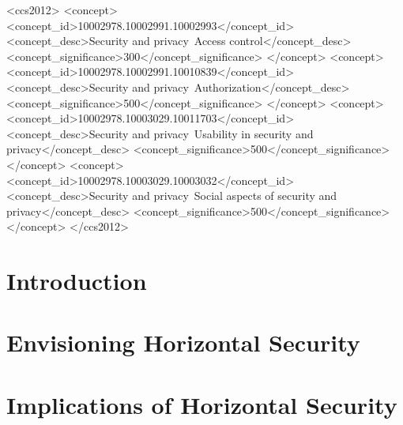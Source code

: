 \documentclass[sigconf, authordraft]{acmart}
\theoremstyle{mydef}
\begin{document}
\begin{CCSXML}
<ccs2012>
   <concept>
       <concept_id>10002978.10002991.10002993</concept_id>
       <concept_desc>Security and privacy~Access control</concept_desc>
       <concept_significance>300</concept_significance>
       </concept>
   <concept>
       <concept_id>10002978.10002991.10010839</concept_id>
       <concept_desc>Security and privacy~Authorization</concept_desc>
       <concept_significance>500</concept_significance>
       </concept>
   <concept>
       <concept_id>10002978.10003029.10011703</concept_id>
       <concept_desc>Security and privacy~Usability in security and privacy</concept_desc>
       <concept_significance>500</concept_significance>
       </concept>
   <concept>
       <concept_id>10002978.10003029.10003032</concept_id>
       <concept_desc>Security and privacy~Social aspects of security and privacy</concept_desc>
       <concept_significance>500</concept_significance>
       </concept>
 </ccs2012>
\end{CCSXML}



\maketitle

\section{Introduction}
\label{sec:introduction}


\section{Envisioning Horizontal Security}
\label{sec:envisioning}


\section{Implications of Horizontal Security}
\label{sec:implications}

\end{document}

